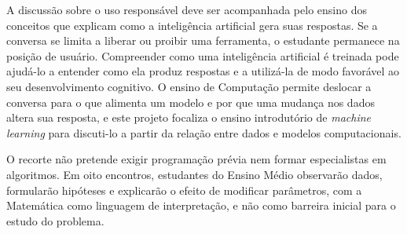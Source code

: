 A discussão sobre o uso responsável deve ser acompanhada pelo ensino dos conceitos que explicam como a inteligência artificial gera suas respostas. Se a conversa se limita a liberar ou proibir uma ferramenta, o estudante permanece na posição de usuário. Compreender como uma inteligência artificial é treinada pode ajudá-lo a entender como ela produz respostas e a utilizá-la de modo favorável ao seu desenvolvimento cognitivo. O ensino de Computação permite deslocar a conversa para o que alimenta um modelo e por que uma mudança nos dados altera sua resposta, e este projeto focaliza o ensino introdutório de \textit{machine learning} para discuti-lo a partir da relação entre dados e modelos computacionais.

O recorte não pretende exigir programação prévia nem formar especialistas em algoritmos. Em oito encontros, estudantes do Ensino Médio observarão dados, formularão hipóteses e explicarão o efeito de modificar parâmetros, com a Matemática como linguagem de interpretação, e não como barreira inicial para o estudo do problema.



